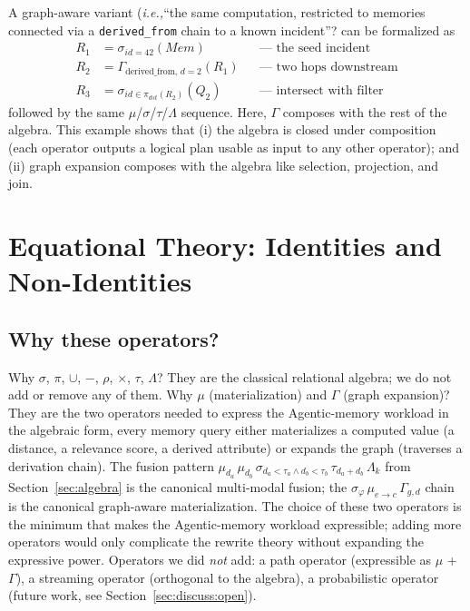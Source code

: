 \documentclass[sigconf]{acmart}
\theoremstyle{plain}
\theoremstyle{definition}
\newcommand{\Mem}{\mathit{Mem}}
\newcommand{\ie}{\emph{i.e.,}\xspace}
\theoremstyle{remark}
\begin{document}
A graph-aware variant (\ie ``the same computation, restricted to memories connected via a \texttt{derived\_from} chain to a known incident''? can be formalized as
\begin{align*}
R_1 &= \sigma_{\mathit{id} = 42}(\Mem) &&\text{--- the seed incident} \\
R_2 &= \Gamma_{\mathrm{derived\_from},\,d=2}(R_1) &&\text{--- two hops downstream} \\
R_3 &= \sigma_{\mathit{id} \in \pi_{\mathit{dst}}(R_2)}(Q_2) &&\text{--- intersect with filter}
\end{align*}
followed by the same $\mu$/$\sigma$/$\tau$/$\Lambda$ sequence. Here, $\Gamma$ composes with the rest of the algebra. This example shows that (i) the algebra is closed under composition (each operator outputs a logical plan usable as input to any other operator); and (ii) graph expansion composes with the algebra like selection, projection, and join.
\section{Equational Theory: Identities and Non-Identities}\label{sec:equational}

\subsection{Why these operators?}

Why $\sigma$, $\pi$, $\cup$, $-$, $\rho$, $\times$, $\tau$, $\Lambda$?
They are the classical relational algebra; we do not add or remove
any of them. Why $\mu$ (materialization) and $\Gamma$ (graph
expansion)? They are the two operators needed to express the
Agentic-memory workload in the algebraic form, every
memory query either materializes a computed value (a distance,
a relevance score, a derived attribute) or expands the graph
(traverses a derivation chain). The fusion pattern
$\mu_{d_a}\,\mu_{d_b}\,\sigma_{d_a<\tau_a\wedge d_b<\tau_b}\,
\tau_{d_a + d_b}\,\Lambda_k$ from Section~\ref{sec:algebra}
is the canonical multi-modal fusion; the
$\sigma_{\varphi}\,\mu_{e\to c}\,\Gamma_{g,d}$ chain is
the canonical graph-aware materialization. The choice of these
two operators is the minimum that makes the Agentic-memory
workload expressible; adding more operators would only
complicate the rewrite theory without expanding the
expressive power. Operators we did \emph{not} add: a path
operator (expressible as $\mu$ + $\Gamma$), a streaming
operator (orthogonal to the algebra), a probabilistic
operator (future work, see Section~\ref{sec:discuss:open}).
\end{document}
